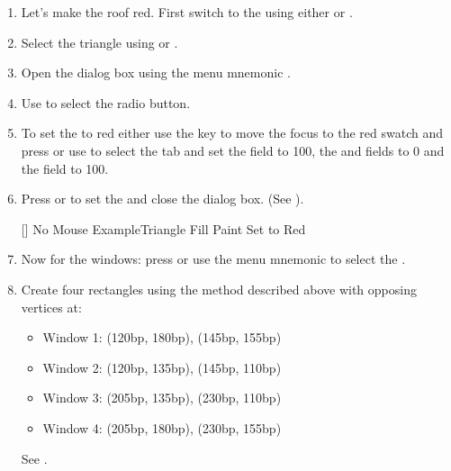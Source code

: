 \begin{enumerate}
[]
{}
{No Mouse Example\dash Completed Triangle}

\item Let's make the roof red. First switch to the 
using either  or .

\item Select the triangle using  or
.

\item Open the  dialog box using the menu mnemonic
.

\item Use  to select the
 radio button.

\item To set the  to red either use the
 key to move
the focus to the red  swatch and press
 or use
 to select the
 tab and set the
 field to 100, the
 and 
fields to 0 and the  field to 100.

\item Press  or  to set the
 and close the dialog box. (See
).

[]
{}
{No Mouse Example\dash Triangle Fill Paint Set to Red}

\item Now for the windows: press  or use the menu mnemonic
 to select the .

\item Create four rectangles using the method described above with
opposing vertices at:
\begin{itemize}
\item Window 1: (120bp, 180bp), (145bp, 155bp)
\item Window 2: (120bp, 135bp), (145bp, 110bp)
\item Window 3: (205bp, 135bp), (230bp, 110bp)
\item Window 4: (205bp, 180bp), (230bp, 155bp)
\end{itemize}
See .


\end{enumerate}
